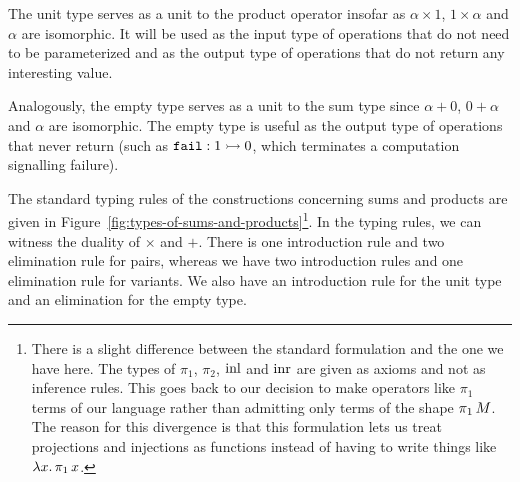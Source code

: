 The unit type serves as a unit to the product operator insofar as $\alpha
\times 1$, $1 \times \alpha$ and $\alpha$ are isomorphic. It will be used
as the input type of operations that do not need to be parameterized and as
the output type of operations that do not return any interesting value.

Analogously, the empty type serves as a unit to the sum type since $\alpha
+ 0$, $0 + \alpha$ and $\alpha$ are isomorphic. The empty type is useful as
the output type of operations that never return (such as
$\mathtt{fail} : 1 \rightarrowtail 0$, which terminates a computation signalling failure).

The standard typing rules of the constructions concerning sums and products
are given in Figure~\ref{fig:types-of-sums-and-products}\footnote{There is
  a slight difference between the standard formulation and the one we have
  here. The types of $\pi_1$, $\pi_2$, $\operatorname{inl}$ and $\operatorname{inr}$ are given as
  axioms and not as inference rules. This goes back to our decision to make
  operators like $\pi_1$ terms of our language rather than admitting only
  terms of the shape $\pi_1\,M$. The reason for this divergence is
  that this formulation lets us treat projections and injections as
  functions instead of having to write things like
  $\lambda x.\, \pi_1\,x$.}. In the typing rules, we can witness the
duality of $\times$ and $+$. There is one introduction rule and two
elimination rule for pairs, whereas we have two introduction rules and one
elimination rule for variants. We also have an introduction rule for the
unit type and an elimination for the empty type.

